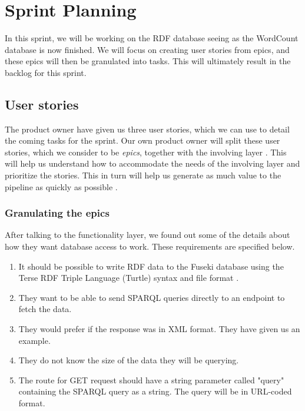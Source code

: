 \section{Sprint Planning}
In this sprint, we will be working on the RDF database seeing as the WordCount database is now finished.
We will focus on creating user stories from epics, and these epics will then be granulated into tasks.
This will ultimately result in the backlog for this sprint.

\subsection*{User stories}
The \knox{} product owner have given us three user stories, which we can use to detail the coming tasks for the sprint.
Our own product owner will split these user stories, which we consider to be \textit{epics}, together with the involving layer \cite{Epics}.
This will help us understand how to accommodate the needs of the involving layer and prioritize the stories.
This in turn will help us generate as much value to the pipeline as quickly as possible \cite{UserStories}.


\subsubsection*{Granulating the epics}
After talking to the functionality layer, we found out some of the details about how they want database access to work. These requirements are specified below.

\begin{enumerate}
    \item It should be possible to write RDF data to the Fuseki database using the Terse RDF Triple Language (Turtle) syntax and file format \cite{TurtleFormat}.
    \item They want to be able to send SPARQL queries directly to an endpoint to fetch the data.
    \item They would prefer if the response was in XML format. They have given us an example.
    \item They do not know the size of the data they will be querying.
    \item The route for GET request should have a string parameter called "query" containing the SPARQL query as a string.
    The query will be in URL-coded format.
\end{enumerate}

